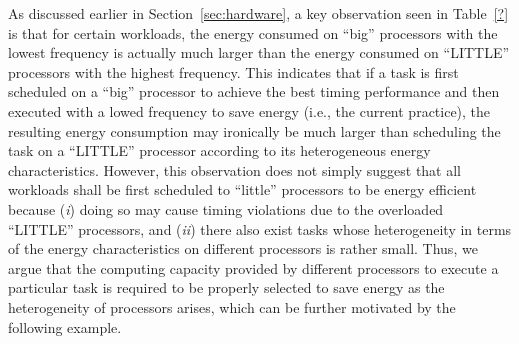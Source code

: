  As discussed earlier in Section~\ref{sec:hardware}, a key observation seen in Table~\ref{?} is that for certain workloads, the energy consumed on ``big'' processors with the lowest frequency is actually much larger than the energy consumed on ``LITTLE'' processors with the highest frequency. This indicates that if a task is first scheduled on a ``big'' processor to achieve the best  timing performance and then executed with a lowed frequency to save energy (i.e., the current practice), the resulting energy consumption may ironically be much larger than scheduling the task on a ``LITTLE'' processor according to its heterogeneous energy characteristics.  However, this observation does not simply suggest that all workloads shall be first scheduled to ``little'' processors to be energy efficient because (\textit{i}) doing so may cause timing violations due to the overloaded ``LITTLE'' processors, and (\textit{ii}) there also exist tasks whose heterogeneity in terms of the energy characteristics on different processors is rather small. Thus, we argue that the computing capacity provided by different processors to execute a particular task is required to be properly selected to save energy as the heterogeneity of processors arises, which can be further motivated by the following example.




